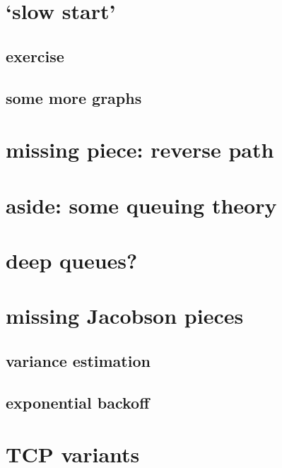 \section{`slow start'}


\subsection{exercise}


\subsection{some more graphs}


\section{missing piece: reverse path}


\section{aside: some queuing theory}


\section{deep queues?}


\section{missing Jacobson pieces}

\subsection{variance estimation}


\subsection{exponential backoff}


\section{TCP variants}


